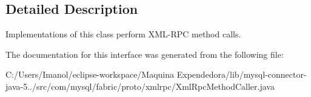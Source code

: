 \subsection{Detailed Description}
Implementations of this class perform X\+M\+L-\/\+R\+PC method calls. 

The documentation for this interface was generated from the following file\+:\begin{DoxyCompactItemize}
\item 
C\+:/\+Users/\+Imanol/eclipse-\/workspace/\+Maquina Expendedora/lib/mysql-\/connector-\/java-\/5../src/com/mysql/fabric/proto/xmlrpc/Xml\+Rpc\+Method\+Caller.\+java\end{DoxyCompactItemize}
